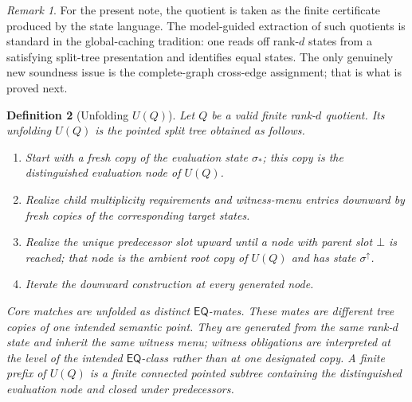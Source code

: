 \documentclass[11pt]{article}
\newtheorem{definition}{Definition}[section]
\theoremstyle{remark}
\newtheorem{remark}[definition]{Remark}
\newcommand{\EQ}{\mathsf{EQ}}
\begin{document}
\begin{remark}
For the present note, the quotient is taken as the finite certificate produced by the state language. The model-guided extraction of such quotients is standard in the global-caching tradition: one reads off rank-$d$ states from a satisfying split-tree presentation and identifies equal states. The only genuinely new soundness issue is the complete-graph cross-edge assignment; that is what is proved next.
\end{remark}

\begin{definition}[Unfolding $U(Q)$]\label{def:UQ}
Let $Q$ be a valid finite rank-$d$ quotient. Its unfolding $U(Q)$ is the pointed split tree obtained as follows.
\begin{enumerate}[label=(\roman*)]
    \item Start with a fresh copy of the evaluation state $\sigma_{\ast}$; this copy is the distinguished evaluation node of $U(Q)$.
    \item Realize child multiplicity requirements and witness-menu entries downward by fresh copies of the corresponding target states.
    \item Realize the unique predecessor slot upward until a node with parent slot $\bot$ is reached; that node is the ambient root copy of $U(Q)$ and has state $\sigma^{\uparrow}$.
    \item Iterate the downward construction at every generated node.
\end{enumerate}
Core matches are unfolded as distinct $\EQ$-mates. These mates are different tree copies of one intended semantic point. They are generated from the same rank-$d$ state and inherit the same witness menu; witness obligations are interpreted at the level of the intended $\EQ$-class rather than at one designated copy. A \emph{finite prefix} of $U(Q)$ is a finite connected pointed subtree containing the distinguished evaluation node and closed under predecessors.
\end{definition}
\end{document}
